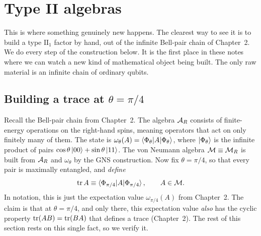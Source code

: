 \section{Type II algebras}

This is where something genuinely new happens. The clearest way to see it is to build a type $\mathrm{II}_1$
factor by hand, out of the infinite Bell-pair chain of Chapter~2. We do every step of the construction below.
It is the first place in these notes where we can watch a new kind of mathematical object being built. The only
raw material is an infinite chain of ordinary qubits.

\subsection*{Building a trace at $\theta=\pi/4$}

Recall the Bell-pair chain from Chapter~2. The algebra $\mathcal{A}_R$ consists of finite-energy operations on the
right-hand spins, meaning operators that act on only finitely many of them. The state is
$\omega_\theta(A)=\braket{\Phi_\theta|A|\Phi_\theta}$, where $\ket{\Phi_\theta}$ is the infinite product of
pairs $\cos\theta\ket{00}+\sin\theta\ket{11}$. The von Neumann algebra $\mathcal{M}\equiv\mathcal{M}_R$ is built from $\mathcal{A}_R$
and $\omega_\theta$ by the GNS construction. Now fix $\theta=\pi/4$, so that every pair is maximally
entangled, and \emph{define}
\begin{equation}
\operatorname{tr} A \equiv \braket{\Phi_{\pi/4}|A|\Phi_{\pi/4}} , \qquad A\in\mathcal{M} .
\label{eq:typeII-trace}
\end{equation}
In notation, this is just the expectation value $\omega_{\pi/4}(A)$ from Chapter~2. The claim is that at
$\theta=\pi/4$, and only there, this expectation value \emph{also} has the cyclic property $\operatorname{tr}(AB)=\operatorname{tr}(BA)$
that defines a trace (Chapter~2). The rest of this section rests on this single fact, so we verify it.


